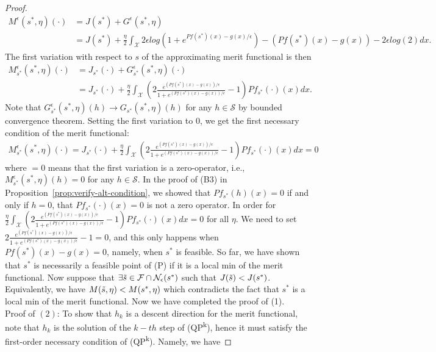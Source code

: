 \documentclass[12pt,leqno]{amsart}
\begin{document}
\begin{proof}
    \begin{align*}
        M^\epsilon(s^*,\eta)(\cdot)&=J(s^*)+G^\epsilon(s^*,\eta)\\
        &= J(s^*)+\frac{\eta}{2}\int_{\mathcal{X}}2\epsilon log(1+e^{Pf(s^*)(x)-g(x)/\epsilon})-(Pf(s^*)(x)-g(x))-2\epsilon log(2)dx.
    \end{align*}
The first variation with respect to $s$ of the approximating merit functional is then
 \begin{align*}
        M_{s^*}^\epsilon(s^*,\eta)(\cdot)&=J_{s^*}(\cdot)+G_{s^*}^\epsilon(s^*,\eta)(\cdot)\\
        &= J_{s^*}(\cdot)+\frac{\eta}{2}\int_{\mathcal{X}}\left(2\frac{e^{(Pf(s^*)(x)-g(x))/\epsilon}}{1+e^{(Pf(s^*)(x)-g(x))/\epsilon}}-1\right)Pf_{s^*}(\cdot)(x)dx.
    \end{align*}
    Note that $G_{s^*}^\epsilon(s^*,\eta)(h)\to G_{s^*}(s^*,\eta)(h)$ for any $h\in\mathcal{S}$ by bounded convergence theorem. 
    Setting the first variation to 0, we get the first necessary condition of the merit functional:
    \begin{align*}
        M_{s^*}^\epsilon(s^*,\eta)(\cdot)=J_{s^*}(\cdot)+\frac{\eta}{2}\int_{\mathcal{X}}\left(2\frac{e^{(Pf(s^*)(x)-g(x))/\epsilon}}{1+e^{(Pf(s^*)(x)-g(x))/\epsilon}}-1\right)Pf_{s^*}(\cdot)(x)dx = 0
    \end{align*}
    where $=0$ means that the first variation is a zero-operator, i.e., $M_{s^*}^\epsilon(s^*,\eta)(h)=0$ for any $h\in\mathcal{S}$.
    In the proof of (B3) in Proposition~\ref{prop:verify-alt-condition}, we showed that $Pf_{s^*}(h)(x)=0$ if and only if $h=0$, that $Pf_{s^*}(\cdot)(x)=0$ is not a zero operator. In order for $\frac{\eta}{2}\int_{\mathcal{X}}\left(2\frac{e^{(Pf(s^*)(x)-g(x))/\epsilon}}{1+e^{(Pf(s^*)(x)-g(x))/\epsilon}}-1\right)Pf_{s^*}(\cdot)(x)dx=0$ for all $\eta$. We need to set $2\frac{e^{(Pf(s^*)(x)-g(x))/\epsilon}}{1+e^{(Pf(s^*)(x)-g(x))/\epsilon}}-1=0$, and this only happens when $Pf(s^*)(x)-g(x)=0$, namely, when $s^*$ is feasible. So far, we have shown that $s^*$ is necessarily a feasible point of (P) if it is a local min of the merit functional. Now suppose that $\exists \Tilde{s}\in\mathcal{F}\cap\mathcal{N}_{\epsilon}(s^*)$ such that $J(\Tilde{s})<J(s^*)$. Equivalently, we have $M(\Tilde{s},\eta)<M(s^*,\eta)$ which contradicts the fact that $s^*$ is a local min of the merit functional. Now we have completed the proof of (1).\\
    Proof of $(2)$: To show that $h_k$ is a descent direction for the merit functional, note that $h_k$ is the solution of the $k-th$ step of (QP\textsuperscript{k}), hence it must satisfy the first-order necessary condition of (QP\textsuperscript{k}). Namely, we have

\end{proof}
\end{document}
